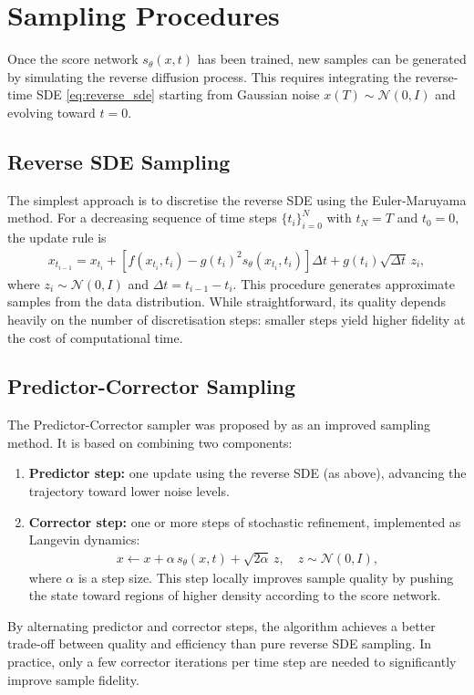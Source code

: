 \documentclass[12pt]{report}
\begin{document}
\section{Sampling Procedures}
Once the score network \(s_\theta(x,t)\) has been trained, new samples can be generated by simulating the reverse diffusion process. This requires integrating the reverse-time SDE \eqref{eq:reverse_sde} starting from Gaussian noise \(x(T) \sim \mathcal{N}(0,I)\) and evolving toward \(t=0\).

\subsection{Reverse SDE Sampling}
The simplest approach is to discretise the reverse SDE using the Euler-Maruyama method. 
For a decreasing sequence of time steps \(\{t_i\}_{i=0}^N\) with \(t_N = T\) and \(t_0 = 0\), the update rule is
\begin{align*}
    x_{t_{i-1}} = x_{t_i} + \left[f(x_{t_i},t_i) - g(t_i)^2 s_\theta(x_{t_i},t_i)\right]\Delta t + g(t_i)\sqrt{\Delta t}\,z_i,
\end{align*}
where $z_i \sim \mathcal{N}(0,I)$ and $\Delta t = t_{i-1} - t_i$. 
This procedure generates approximate samples from the data distribution. 
While straightforward, its quality depends heavily on the number of discretisation steps: smaller steps yield higher fidelity at the cost of computational time.

\subsection{Predictor-Corrector Sampling}
The Predictor-Corrector sampler was proposed by \cite{song2020score} as an improved sampling method. It is based on combining two components:
\begin{enumerate}
  \item \textbf{Predictor step:} one update using the reverse SDE (as above), advancing the trajectory toward lower noise levels.  
  \item \textbf{Corrector step:} one or more steps of stochastic refinement, implemented as Langevin dynamics:
    \begin{align*}
        x \leftarrow x + \alpha\, s_\theta(x,t) + \sqrt{2\alpha}\,z, \quad z \sim \mathcal{N}(0,I),
    \end{align*}
    where $\alpha$ is a step size. This step locally improves sample quality by pushing the state toward regions of higher density according to the score network.
\end{enumerate}
By alternating predictor and corrector steps, the algorithm achieves a better trade-off between quality and efficiency than pure reverse SDE sampling. 
In practice, only a few corrector iterations per time step are needed to significantly improve sample fidelity.
\end{document}
